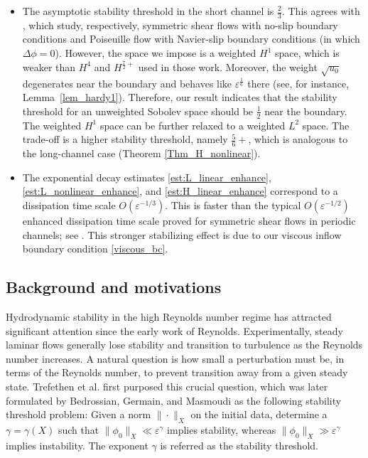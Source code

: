 \documentclass[reqno, 11pt]{amsart}
\theoremstyle{plain}
\theoremstyle{definition}
\theoremstyle{remark}
\numberwithin{equation}{section}
\begin{document}
\begin{itemize}
\item The asymptotic stability threshold in the short channel is $\frac{2}{3}$. This agrees with \cites{Chen-Li-Shen-Zhang25, Ding-Lin25}, which study, respectively, symmetric shear flows with no-slip boundary conditions and Poiseuille flow with Navier-slip boundary conditions (in which $\Delta\phi=0$). However, the space we impose is a weighted $H^1$ space, which is weaker than $H^4$ and $H^{\frac{7}{2}+}$ used in those work. Moreover, the weight $\sqrt{u_0}$ degenerates near the boundary and behaves like $\varepsilon^{\frac{1}{6}}$ there (see, for instance, Lemma~\ref{lem_hardy1}). Therefore, our result indicates that the stability threshold for an unweighted Sobolev space should be $\frac{1}{2}$ near the boundary. The weighted $H^1$ space can be further relaxed to a weighted $L^2$ space. The trade-off is a higher stability threshold, namely $\frac{5}{6}+$, which is analogous to the long-channel case (Theorem \ref{Thm_H_nonlinear}).\\

\item The exponential decay estimates \eqref{est:L_linear_enhance}, \eqref{est:L_nonlinear_enhance}, and \eqref{est:H_linear_enhance} correspond to a dissipation time scale $O(\varepsilon^{-1/3})$. This is faster than the typical $O(\varepsilon^{-1/2})$ enhanced dissipation time scale proved for symmetric shear flows in periodic channels; see \cites{CotiZelati-Elgindi-Widmayer20, Zotto23, Ding-Lin25, Chen-Li-Shen-Zhang25}. This stronger stabilizing effect is due to our viscous inflow boundary condition \eqref{viscous_bc}.\\

\end{itemize}



\subsection{Background and motivations}

Hydrodynamic stability in the high Reynolds number regime has attracted significant attention since the early work of Reynolds. Experimentally, steady laminar flows generally lose stability and transition to turbulence as the Reynolds number increases. A natural question is how small a perturbation must be, in terms of the Reynolds number, to prevent transition away from a given steady state. Trefethen et al. \cite{Trefethen} first purposed this crucial question, which was later formulated by Bedrossian, Germain, and Masmoudi \cites{Bedrossian-Germain-Masmoudi17, Bedrossian-Germain-Masmoudi19} as the following stability threshold problem: Given a norm $\| \cdot\|_X$ on the initial data, determine a $\gamma = \gamma(X)$ such that $\| \phi_0\|_X \ll \varepsilon^\gamma$ implies stability, whereas $\| \phi_0\|_X \gg \varepsilon^\gamma$ implies instability. The exponent $\gamma$ is referred as the stability threshold.
\end{document}
